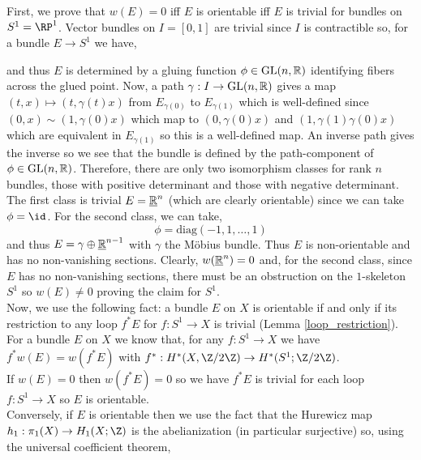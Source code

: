 \documentclass[12pt]{extarticle}
\begin{document}
First, we prove that $w(E) = 0$ iff $E$ is orientable iff $E$ is trivial for bundles on $S^1 = \RP^1$. Vector bundles on $I = [0, 1]$ are trivial since $I$ is contractible so, for a bundle $E \to S^1$ we have,
\begin{center}
\end{center} 
and thus $E$ is determined by a gluing function $\phi \in \mathrm{GL}(n, \mathbb{R})$ identifying fibers across the glued point. Now, a path $\gamma : I \to \mathrm{GL}(n, \mathbb{R})$ gives a map $(t, x) \mapsto (t, \gamma(t)x)$ from $E_{\gamma(0)}$ to $E_{\gamma(1)}$ which is well-defined since $(0, x) \sim (1, \gamma(0) x)$ which map to $(0, \gamma(0) x)$ and $(1, \gamma(1) \gamma(0) x)$ which are equivalent in $E_{\gamma(1)}$ so this is a well-defined map. An inverse path gives the inverse so we see that the bundle is defined by the path-component of $\phi \in \mathrm{GL}(n, \mathbb{R})$. Therefore, there are only two isomorphism classes for rank $n$ bundles, those with positive determinant and those with negative determinant. The first class is trivial $E = \underline{\mathbb{R}}^n$ (which are clearly orientable) since we can take $\phi = \id$. For the second class, we can take,
\[ \phi = \mathrm{diag}(-1, 1, \dots, 1) \]
and thus $E = \gamma \oplus \underline{\mathbb{R}}^{n-1}$ with $\gamma$ the M\"{o}bius bundle. Thus $E$ is non-orientable and has no non-vanishing sections. Clearly, $w(\underline{\mathbb{R}}^n) = 0$ and, for the second class, since $E$ has no non-vanishing sections, there must be an obstruction on the $1$-skeleton $S^1$ so $w(E) \neq 0$ proving the claim for $S^1$. 
\bigskip\\
Now, we use the following fact: a bundle $E$ on $X$ is orientable if and only if its restriction to any loop $f^* E$ for $f : S^1 \to X$ is trivial (Lemma \ref{loop_restriction}). For a bundle $E$ on $X$ we know that, for any $f : S^1 \to X$ we have $f^* w(E) = w(f^* E)$ with $f^* : H^*(X, \Z / 2 \Z) \to H^*(S^1; \Z / 2 \Z)$.
\bigskip\\
If $w(E) = 0$ then $w(f^* E) = 0$ so we have $f^* E$ is trivial for each loop $f : S^1 \to X$ so $E$ is orientable.
\bigskip\\
Conversely, if $E$ is orientable then we use the fact that the Hurewicz map $h_1 : \pi_1(X) \to H_1(X; \Z)$ is the abelianization (in particular surjective) so, using the universal coefficient theorem,
\begin{center}
\end{center}
\end{document}
